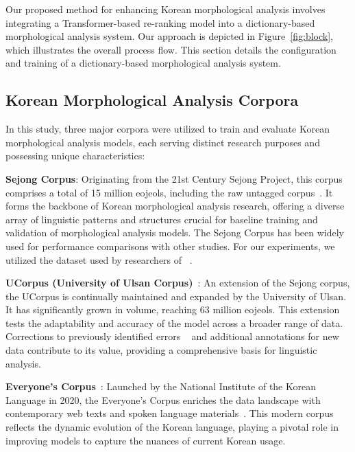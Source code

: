 \documentclass[AMS,STIX2COL]{WileyNJD-v2}
\begin{document}
    Our proposed method for enhancing Korean morphological analysis involves integrating a Transformer-based re-ranking model into a dictionary-based morphological analysis system.
    Our approach is depicted in Figure~\ref{fig:block}, which illustrates the overall process flow.
    This section details the configuration and training of a dictionary-based morphological analysis system.

    \subsection{Korean Morphological Analysis Corpora}\label{subsec:korean-morphological-analysis-corpora}

    In this study, three major corpora were utilized to train and evaluate Korean morphological analysis models, each serving distinct research purposes and possessing unique characteristics:

    \textbf{Sejong Corpus}: Originating from the 21st Century Sejong Project, this corpus comprises a total of 15 million eojeols, including the raw untagged corpus~\cite{ChoeMW2008}.
    It forms the backbone of Korean morphological analysis research, offering a diverse array of linguistic patterns and structures crucial for baseline training and validation of morphological analysis models.
    The Sejong Corpus has been widely used for performance comparisons with other studies.
    For our experiments, we utilized the dataset used by researchers of ~\cite{MinJW2019, MinJW2020, MinJW2022, MinJW2018, NaSH2015, NaSH2014, NaSH2018, SongHJ2019, SongHJ2020}.

    \textbf{UCorpus (University of Ulsan Corpus)}~\cite{UCorpusHG}: An extension of the Sejong corpus, the UCorpus is continually maintained and expanded by the University of Ulsan.
    It has significantly grown in volume, reaching 63 million eojeols.
    This extension tests the adaptability and accuracy of the model across a broader range of data.
    Corrections to previously identified errors ~\cite{KimIH2010} and additional annotations for new data contribute to its value, providing a comprehensive basis for linguistic analysis.

    \textbf{Everyone's Corpus}~\cite{EveryoneCorpus}: Launched by the National Institute of the Korean Language in 2020, the Everyone's Corpus enriches the data landscape with contemporary web texts and spoken language materials~\cite{KimIH2019}.
    This modern corpus reflects the dynamic evolution of the Korean language, playing a pivotal role in improving models to capture the nuances of current Korean usage.
\end{document}
